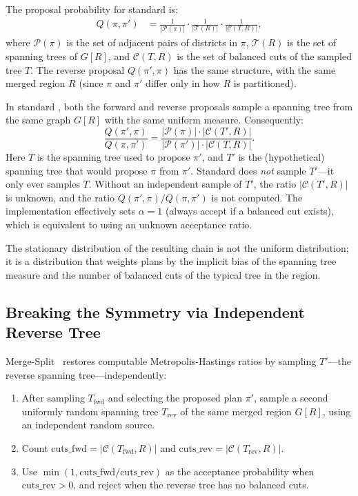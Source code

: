 The proposal probability for standard \recom{} is:
\begin{align}
  Q(\pi, \pi') &= \frac{1}{|\mathcal{P}(\pi)|}
    \cdot \frac{1}{|\mathcal{T}(R)|}
    \cdot \frac{1}{|\mathcal{C}(T, R)|},
\end{align}
where $\mathcal{P}(\pi)$ is the set of adjacent pairs of districts in $\pi$,
$\mathcal{T}(R)$ is the set of spanning trees of $G[R]$, and
$\mathcal{C}(T, R)$ is the set of balanced cuts of the sampled tree $T$.
The reverse proposal $Q(\pi', \pi)$ has the same structure, with the
same merged region $R$ (since $\pi$ and $\pi'$ differ only in how
$R$ is partitioned).

In standard \recom{}, both the forward and reverse proposals sample a spanning
tree from the same graph $G[R]$ with the same uniform measure.
Consequently:
\[
  \frac{Q(\pi', \pi)}{Q(\pi, \pi')}
  = \frac{|\mathcal{P}(\pi)| \cdot |\mathcal{C}(T', R)|}{|\mathcal{P}(\pi')|
    \cdot |\mathcal{C}(T, R)|}.
\]
Here $T$ is the spanning tree used to propose $\pi'$, and $T'$ is the
(hypothetical) spanning tree that would propose $\pi$ from $\pi'$.
Standard \recom{} does \emph{not} sample $T'$---it only ever samples $T$.
Without an independent sample of $T'$, the ratio $|\mathcal{C}(T', R)|$ is
unknown, and the ratio $Q(\pi', \pi) / Q(\pi, \pi')$ is not computed.
The implementation effectively sets $\alpha = 1$ (always accept if a balanced
cut exists), which is equivalent to using an unknown acceptance ratio.

The stationary distribution of the resulting chain is not the uniform
distribution; it is a distribution that weights plans by the implicit bias
of the spanning tree measure and the number of balanced cuts of the typical
tree in the region.

\subsection{Breaking the Symmetry via Independent Reverse Tree}

Merge-Split~\citep{janson2022} restores computable Metropolis-Hastings
ratios by sampling $T'$---the reverse spanning tree---independently:

\begin{enumerate}
  \item After sampling $T_{\mathrm{fwd}}$ and selecting the proposed plan
        $\pi'$, sample a second uniformly random spanning tree
        $T_{\mathrm{rev}}$ of the same merged region $G[R]$, using an
        independent random source.
  \item Count $\mathrm{cuts\_fwd} = |\mathcal{C}(T_{\mathrm{fwd}}, R)|$
        and $\mathrm{cuts\_rev} = |\mathcal{C}(T_{\mathrm{rev}}, R)|$.
  \item Use $\min(1,\mathrm{cuts\_fwd} / \mathrm{cuts\_rev})$ as the
        acceptance probability when $\mathrm{cuts\_rev}>0$, and reject when
        the reverse tree has no balanced cuts.
\end{enumerate}

